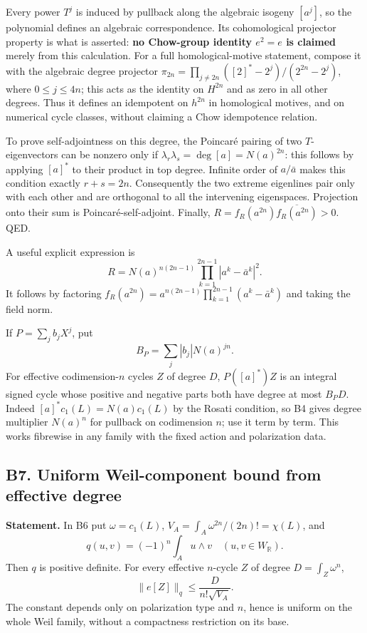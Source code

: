 \documentclass[11pt,a4paper]{article}
\theoremstyle{definition}
\begin{document}
Every power \(T^j\) is induced by pullback along the algebraic isogeny \([a^j]\), so the polynomial defines an algebraic correspondence. Its cohomological projector property is what is asserted: \textbf{no Chow-group identity \(e^2=e\) is claimed} merely from this calculation. For a full homological-motive statement, compose it with the algebraic degree projector \(\pi_{2n}=\prod_{j\ne2n}([2]^*-2^j)/(2^{2n}-2^j)\), where \(0\leq j\leq4n\); this acts as the identity on \(H^{2n}\) and as zero in all other degrees. Thus it defines an idempotent on \(h^{2n}\) in homological motives, and on numerical cycle classes, without claiming a Chow idempotence relation.

To prove self-adjointness on this degree, the Poincaré pairing of two \(T\)-eigenvectors can be nonzero only if \(\lambda_r\lambda_s=\deg[a]=N(a)^{2n}\): this follows by applying \([a]^*\) to their product in top degree. Infinite order of \(a/\bar a\) makes this condition exactly \(r+s=2n\). Consequently the two extreme eigenlines pair only with each other and are orthogonal to all the intervening eigenspaces. Projection onto their sum is Poincaré-self-adjoint. Finally, \(R=f_R(a^{2n})\overline{f_R(a^{2n})}>0\). QED.

A useful explicit expression is \[
 R=N(a)^{n(2n-1)}\prod_{k=1}^{2n-1}|a^k-\bar a^k|^2.
\] It follows by factoring \(f_R(a^{2n})=a^{n(2n-1)}\prod_{k=1}^{2n-1}(a^k-\bar a^k)\) and taking the field norm.

If \(P=\sum_jb_jX^j\), put \[
 B_P=\sum_j|b_j|N(a)^{jn}.
\] For effective codimension-\(n\) cycles \(Z\) of degree \(D\), \(P([a]^*)Z\) is an integral signed cycle whose positive and negative parts both have degree at most \(B_PD\). Indeed \([a]^*c_1(L)=N(a)c_1(L)\) by the Rosati condition, so B4 gives degree multiplier \(N(a)^n\) for pullback on codimension \(n\); use it term by term. This works fibrewise in any family with the fixed action and polarization data.

\subsection{B7. Uniform Weil-component bound from effective degree}\label{b7.-uniform-weil-component-bound-from-effective-degree}

\textbf{Statement.} In B6 put \(\omega=c_1(L)\), \(V_A=\int_A\omega^{2n}/(2n)!=\chi(L)\), and \[
 q(u,v)=(-1)^n\int_Au\wedge v\quad(u,v\in W_\mathbb R).
\] Then \(q\) is positive definite. For every effective \(n\)-cycle \(Z\) of degree \(D=\int_Z\omega^n\), \[
 \|e[Z]\|_q\leq\frac{D}{n!\sqrt{V_A}}.
\] The constant depends only on polarization type and \(n\), hence is uniform on the whole Weil family, without a compactness restriction on its base.
\end{document}

